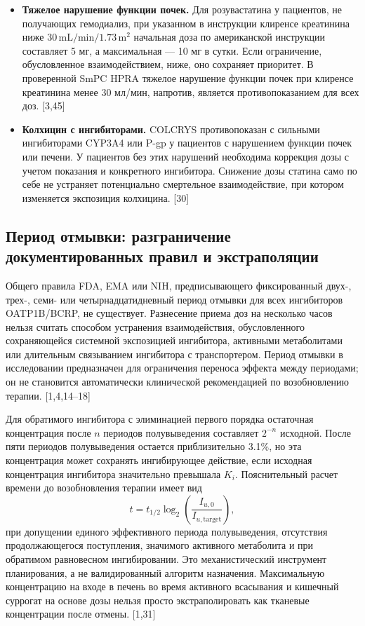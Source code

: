 \documentclass[11pt]{article}
\begin{document}
\begin{itemize}
\item \textbf{Тяжелое нарушение функции почек.} Для розувастатина у пациентов, не получающих гемодиализ, при указанном в инструкции клиренсе креатинина ниже \(30\,\mathrm{mL/min/1.73\,m^2}\) начальная доза по американской инструкции составляет 5 мг, а максимальная --- 10 мг в сутки. Если ограничение, обусловленное взаимодействием, ниже, оно сохраняет приоритет. В проверенной SmPC HPRA тяжелое нарушение функции почек при клиренсе креатинина менее 30 мл/мин, напротив, является противопоказанием для всех доз. [3,45]
\item \textbf{Колхицин с ингибиторами.} COLCRYS противопоказан с сильными ингибиторами CYP3A4 или P-gp у пациентов с нарушением функции почек или печени. У пациентов без этих нарушений необходима коррекция дозы с учетом показания и конкретного ингибитора. Снижение дозы статина само по себе не устраняет потенциально смертельное взаимодействие, при котором изменяется экспозиция колхицина. [30]
\end{itemize}

\subsection{Период отмывки: разграничение документированных правил и экстраполяции}

Общего правила FDA, EMA или NIH, предписывающего фиксированный двух-, трех-, семи- или четырнадцатидневный период отмывки для всех ингибиторов OATP1B/BCRP, не существует. Разнесение приема доз на несколько часов нельзя считать способом устранения взаимодействия, обусловленного сохраняющейся системной экспозицией ингибитора, активными метаболитами или длительным связыванием ингибитора с транспортером. Период отмывки в исследовании предназначен для ограничения переноса эффекта между периодами; он не становится автоматически клинической рекомендацией по возобновлению терапии. [1,4,14--18]

Для обратимого ингибитора с элиминацией первого порядка остаточная концентрация после \(n\) периодов полувыведения составляет \(2^{-n}\) исходной. После пяти периодов полувыведения остается приблизительно 3.1\%, но эта концентрация может сохранять ингибирующее действие, если исходная концентрация ингибитора значительно превышала \(K_i\). Пояснительный расчет времени до возобновления терапии имеет вид
\[
t=t_{1/2}\log_2\left(\frac{I_{u,0}}{I_{u,\mathrm{target}}}\right),
\]
при допущении единого эффективного периода полувыведения, отсутствия продолжающегося поступления, значимого активного метаболита и при обратимом равновесном ингибировании. Это механистический инструмент планирования, а не валидированный алгоритм назначения. Максимальную концентрацию на входе в печень во время активного всасывания и кишечный суррогат на основе дозы нельзя просто экстраполировать как тканевые концентрации после отмены. [1,31]
\end{document}
